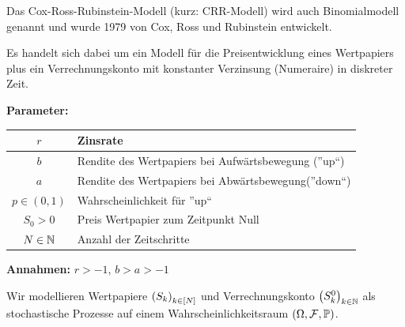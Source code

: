Das Cox-Ross-Rubinstein-Modell (kurz: CRR-Modell) wird auch Binomialmodell genannt und wurde 1979 von Cox, Ross und Rubinstein entwickelt.

Es handelt sich dabei um ein Modell für die Preisentwicklung eines Wertpapiers plus ein Verrechnungskonto mit konstanter Verzinsung (Numeraire) in diskreter Zeit.

\textbf{Parameter:}

\begin{center}
	\begin{tabular}{|c|l|}
		\hline
		$r$ & Zinsrate \\ \hline
		$b$ & Rendite des Wertpapiers bei Aufwärtsbewegung (''up``) \\ \hline
		$a$ & Rendite des Wertpapiers bei Abwärtsbewegung(''down``) \\ \hline
		$p \in (0,1)$ & Wahrscheinlichkeit für ''up`` \\ \hline
		$S_0 > 0$ & Preis Wertpapier zum Zeitpunkt Null \\ \hline
		$N \in \mathbb{N}$ & Anzahl der Zeitschritte \\ \hline
	\end{tabular}
\end{center}

\textbf{Annahmen:} $r > -1$, $b > a > -1$

Wir modellieren Wertpapiere $\left( S_k \right)_{k \in [N]}$ und Verrechnungskonto $\left( S_k^0 \right)_{k \in \mathbb{N}}$ als stochastische Prozesse auf einem Wahrscheinlichkeitsraum $(\Omega, \mathcal{F}, \mathbb{P})$.

